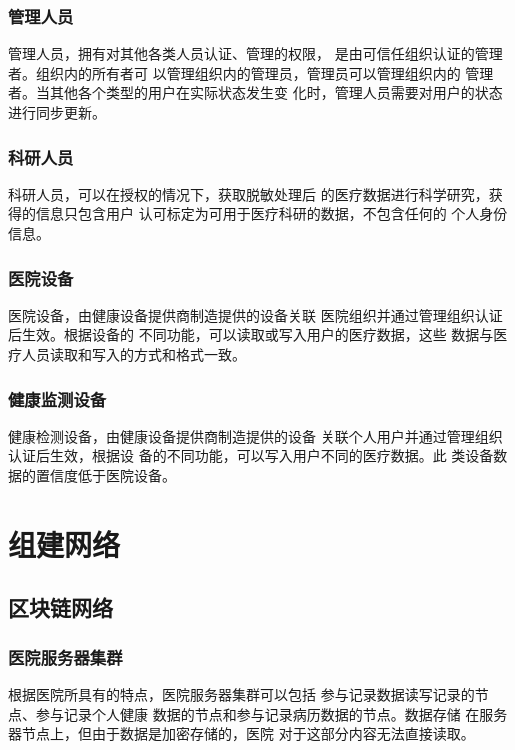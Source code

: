 \documentclass[UTF8]{ctexart}
\begin{document}
    \subsubsection{管理人员}
    \par
    管理人员，拥有对其他各类人员认证、管理的权限，
    是由可信任组织认证的管理者。组织内的所有者可
    以管理组织内的管理员，管理员可以管理组织内的
    管理者。当其他各个类型的用户在实际状态发生变
    化时，管理人员需要对用户的状态进行同步更新。
    \subsubsection{科研人员}
    \par
    科研人员，可以在授权的情况下，获取脱敏处理后
    的医疗数据进行科学研究，获得的信息只包含用户
    认可标定为可用于医疗科研的数据，不包含任何的
    个人身份信息。
    \subsubsection{医院设备}
    \par
    医院设备，由健康设备提供商制造提供的设备关联
    医院组织并通过管理组织认证后生效。根据设备的
    不同功能，可以读取或写入用户的医疗数据，这些
    数据与医疗人员读取和写入的方式和格式一致。
    \subsubsection{健康监测设备}
    \par
    健康检测设备，由健康设备提供商制造提供的设备
    关联个人用户并通过管理组织认证后生效，根据设
    备的不同功能，可以写入用户不同的医疗数据。此
    类设备数据的置信度低于医院设备。

    \section{组建网络}
    \subsection{区块链网络}
    \subsubsection{医院服务器集群}
    \par
    根据医院所具有的特点，医院服务器集群可以包括
    参与记录数据读写记录的节点、参与记录个人健康
    数据的节点和参与记录病历数据的节点。数据存储
    在服务器节点上，但由于数据是加密存储的，医院
    对于这部分内容无法直接读取。
\end{document}

